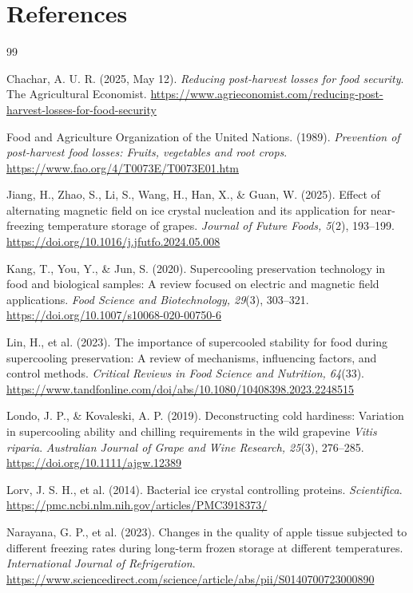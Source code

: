\section*{References}
\begin{thebibliography}{99}

Chachar, A. U. R. (2025, May 12). \emph{Reducing post-harvest losses for food security}. The Agricultural Economist. \url{https://www.agrieconomist.com/reducing-post-harvest-losses-for-food-security}

Food and Agriculture Organization of the United Nations. (1989). \emph{Prevention of post-harvest food losses: Fruits, vegetables and root crops}. \url{https://www.fao.org/4/T0073E/T0073E01.htm}

Jiang, H., Zhao, S., Li, S., Wang, H., Han, X., \& Guan, W. (2025). Effect of alternating magnetic field on ice crystal nucleation and its application for near-freezing temperature storage of grapes. \emph{Journal of Future Foods, 5}(2), 193--199. \url{https://doi.org/10.1016/j.jfutfo.2024.05.008}

Kang, T., You, Y., \& Jun, S. (2020). Supercooling preservation technology in food and biological samples: A review focused on electric and magnetic field applications. \emph{Food Science and Biotechnology, 29}(3), 303--321. \url{https://doi.org/10.1007/s10068-020-00750-6}

Lin, H., et al. (2023). The importance of supercooled stability for food during supercooling preservation: A review of mechanisms, influencing factors, and control methods. \emph{Critical Reviews in Food Science and Nutrition, 64}(33). \url{https://www.tandfonline.com/doi/abs/10.1080/10408398.2023.2248515}

Londo, J. P., \& Kovaleski, A. P. (2019). Deconstructing cold hardiness: Variation in supercooling ability and chilling requirements in the wild grapevine \emph{Vitis riparia}. \emph{Australian Journal of Grape and Wine Research, 25}(3), 276--285. \url{https://doi.org/10.1111/ajgw.12389}

Lorv, J. S. H., et al. (2014). Bacterial ice crystal controlling proteins. \emph{Scientifica}. \url{https://pmc.ncbi.nlm.nih.gov/articles/PMC3918373/}

Narayana, G. P., et al. (2023). Changes in the quality of apple tissue subjected to different freezing rates during long-term frozen storage at different temperatures. \emph{International Journal of Refrigeration}. \url{https://www.sciencedirect.com/science/article/abs/pii/S0140700723000890}


\end{thebibliography}
